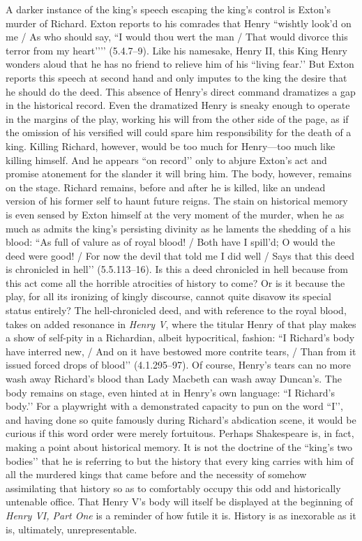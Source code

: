 A darker instance of the king’s speech escaping the king’s control is Exton’s murder of Richard.
Exton reports to his comrades that Henry ``wishtly look’d on me / As who should say, ``I would thou wert the man / That would divorce this terror from my heart’’’’ (5.4.7--9).
Like his namesake, Henry II, this King Henry wonders aloud that he has no friend to relieve him of his ``living fear.’’ But Exton reports this speech at second hand and only imputes to the king the desire that he should do the deed.
This absence of Henry’s direct command dramatizes a gap in the historical record.
Even the dramatized Henry is sneaky enough to operate in the margins of the play, working his will from the other side of the page, as if the omission of his versified will could spare him responsibility for the death of a king.
Killing Richard, however, would be too much for Henry---too much like killing himself.
And he appears ``on record’’ only to abjure Exton’s act and promise atonement for the slander it will bring him.
The body, however, remains on the stage.
Richard remains, before and after he is killed, like an undead version of his former self to haunt future reigns.
The stain on historical memory is even sensed by Exton himself at the very moment of the murder, when he as much as admits the king’s persisting divinity as he laments the shedding of a his blood: ``As full of valure as of royal blood! / Both have I spill’d; O would the deed were good! / For now the devil that told me I did well / Says that this deed is chronicled in hell’’ (5.5.113--16).
Is this a deed chronicled in hell because from this act come all the horrible atrocities of history to come? Or is it because the play, for all its ironizing of kingly discourse, cannot quite disavow its special status entirely? The hell-chronicled deed, and with reference to the royal blood, takes on added resonance in \emph{Henry V}, where the titular Henry of that play makes a show of self-pity in a Richardian, albeit hypocritical, fashion: ``I Richard's body have interred new, / And on it have bestowed more contrite tears, / Than from it issued forced drops of blood’’ (4.1.295--97).
Of course, Henry’s tears can no more wash away Richard’s blood than Lady Macbeth can wash away Duncan’s.
The body remains on stage, even hinted at in Henry’s own language: ``I Richard’s body.’’ For a playwright with a demonstrated capacity to pun on the word ``I’’, and having done so quite famously during Richard’s abdication scene, it would be curious if this word order were merely fortuitous.
Perhaps Shakespeare is, in fact, making a point about historical memory.
It is not the doctrine of the ``king’s two bodies’’ that he is referring to but the history that every king carries with him of all the murdered kings that came before and the necessity of somehow assimilating that history so as to comfortably occupy this odd and historically untenable office.
That Henry V’s body will itself be displayed at the beginning of \emph{Henry VI, Part One} is a reminder of how futile it is.
History is as inexorable as it is, ultimately, unrepresentable.

